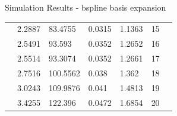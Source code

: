 \documentclass{beamer}
\begin{document}
\begin{frame}{Simulation Results - bspline basis expansion}
\begin{table}
{\begin{tabular}{lllllll}
 & 2.2887                        & 83.4755                      & 0.0315                        & 1.1363                        & 15               &  \\
 & 2.5491                        & 93.593                       & 0.0352                        & 1.2652                        & 16               &  \\
 & 2.5514                        & 93.3074                      & 0.0352                        & 1.2661                        & 17               &  \\
 & 2.7516                        & 100.5562                     & 0.038                         & 1.362                         & 18               &  \\
 & 3.0243                        & 109.9876                     & 0.041                         & 1.4813                        & 19               &  \\
 & 3.4255                        & 122.396                      & 0.0472                        & 1.6854                        & 20               & 
\end{tabular}%
}
\end{table}
	\end{frame}
	
	
	
\end{document}
